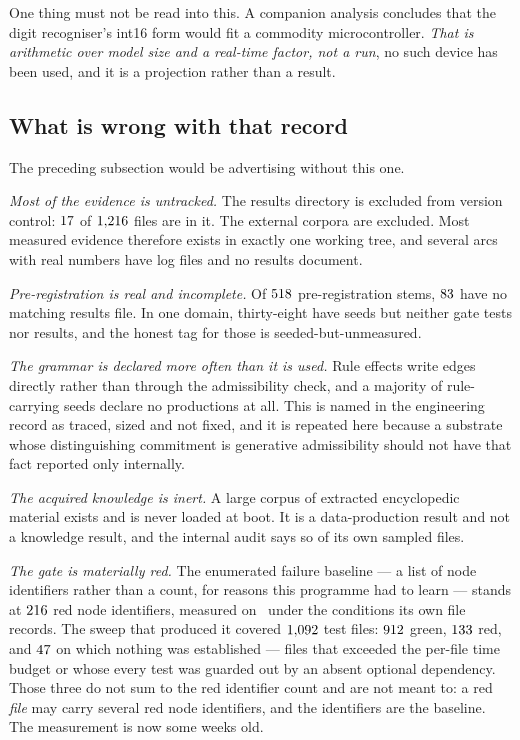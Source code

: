 \documentclass[11pt,a4paper]{article}
\begin{document}
One thing must not be read into this. A companion analysis concludes that the digit recogniser's
int16 form would fit a commodity microcontroller. \emph{That is arithmetic over model size and a
real-time factor, not a run}, no such device has been used, and it is a projection rather than a
result.

\subsection{What is wrong with that record}\label{sec:record-wrong}
The preceding subsection would be advertising without this one.

\emph{Most of the evidence is untracked.} The results directory is excluded from version control:
$17$ of $1{,}216$ files are in it. The external corpora are excluded. Most measured evidence
therefore exists in exactly one working tree, and several arcs with real numbers have log files and no
results document.

\emph{Pre-registration is real and incomplete.} Of $518$ pre-registration stems,
$83$ have no matching results file. In one domain, thirty-eight have seeds but neither gate tests nor results, and the honest
tag for those is seeded-but-unmeasured.

\emph{The grammar is declared more often than it is used.} Rule effects write edges directly rather
than through the admissibility check, and a majority of rule-carrying seeds declare no productions at
all. This is named in the engineering record as traced, sized and not fixed, and it is repeated here
because a substrate whose distinguishing commitment is generative admissibility should not have that
fact reported only internally.

\emph{The acquired knowledge is inert.} A large corpus of extracted encyclopedic material exists and is
never loaded at boot. It is a data-production result and not a knowledge result, and the internal audit
says so of its own sampled files.

\emph{The gate is materially red.} The enumerated failure baseline --- a list of node identifiers
rather than a count, for reasons this programme had to learn --- stands at $216$ red node
identifiers, measured on \baselineMeasuredOn\ under the conditions its own file records. The sweep
that produced it covered $1{,}092$ test files: $912$ green, $133$ red, and
$47$ on which nothing was established --- files that exceeded the per-file time
budget or whose every test was guarded out by an absent optional dependency. Those three do not sum
to the red identifier count and are not meant to: a red \emph{file} may carry several red node
identifiers, and the identifiers are the baseline. The measurement is now some weeks old.
\end{document}
